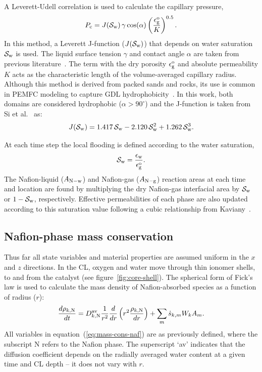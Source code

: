 \documentclass[final,3p,times,twocolumn]{elsarticle}    %
\begin{document}
A Leverett-Udell correlation is used to calculate the capillary pressure,
\begin{equation}
    P_{\rm c} = J({\cal S}_{\rm w})\, \gamma \cos(\alpha) 
    \left( \frac{\epsilon_{\rm g}^{\rm o}}{K} \right)^{0.5}.
\end{equation}
In this method, a Leverett J-function ($J({\cal S}_{\rm w})$) that depends on water saturation ${\cal S}_{\rm w}$ is used. The liquid surface tension $\gamma$ and contact angle $\alpha$ are taken from previous literature~\cite{bib:vetter_2019, bib:sigwadi_2019}. The term with the dry porosity $\epsilon_{\rm g}^{\rm o}$ and absolute permeability $K$ acts as the characteristic length of the volume-averaged capillary radius. Although this method is derived from packed sands and rocks, its use is common in PEMFC modeling to capture GDL hydrophobicity~\cite{bib:si_2015}. In this work, both domains are considered hydrophobic ($\alpha > 90^{\circ}$) and the J-function is taken from Si et al.~\cite{bib:si_2015} as: 
\begin{equation}
    J({\cal S}_{\rm w}) = 1.417\,{\cal S}_{\rm w} - 2.120\,{\cal S}_{\rm w}^2 + 1.262\,{\cal S}_{\rm w}^3.
\end{equation}

At each time step the local flooding is defined according to the water saturation,
\begin{equation}
    {\cal S}_{\rm w} = \frac{\epsilon_{\rm w}}{\epsilon_{\rm g}^{\rm o}}.
\end{equation}
The Nafion-liquid ($A_{\rm N-w}$) and Nafion-gas ($A_{\rm N-g}$) reaction areas at each time and location are found by multiplying the dry Nafion-gas interfacial area by ${\cal S}_{\rm w}$ or $1-{\cal S}_{\rm w}$, respectively. Effective permeabilities of each phase are also updated according to this saturation value following a cubic relationship from Kaviany~\cite{bib:kaviany_2012}. 

\subsection{Nafion-phase mass conservation}

Thus far all state variables and material properties are assumed uniform in the $x$ and $z$ directions. In the CL, 
oxygen and water move through thin ionomer shells, to and from the catalyst (see figure~\ref{fig:core-shell}). The spherical form of Fick's law is used to calculate the mass density of Nafion-absorbed species as a function of radius ($r$):
\begin{equation} \label{eq:mass-cons-naf}
    \frac{d \rho_{k,\rm N}}{d t} = D_{k,\rm N}^{\rm av}
    \frac{1}{r^2} \frac{d}{d r} \left( r^2 \frac{\rho_{k,\rm N}}{dr} \right) 
    + \sum_m \dot{s}_{k,m} W_k A_m.
\end{equation}
All variables in equation~(\ref{eq:mass-cons-naf}) are as previously defined, where the subscript N refers to the Nafion phase. The superscript `av' indicates that the diffusion coefficient depends on the radially averaged water content at a given time and CL depth -- it does not vary with $r$.
\end{document}
